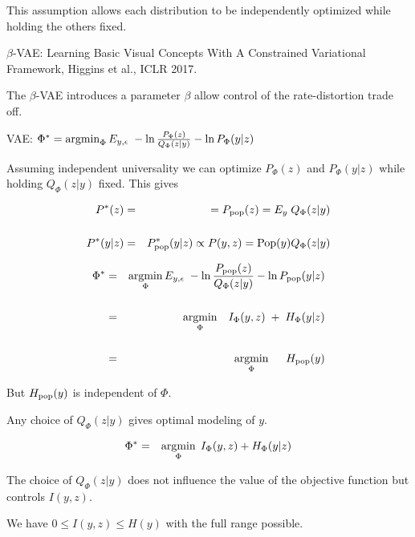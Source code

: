 {\vfill
This assumption allows each distribution to be independently optimized while holding the others fixed.


$\beta$-VAE: Learning Basic Visual Concepts With A
Constrained Variational Framework, Higgins et al., ICLR 2017.

\vfill
The $\beta$-VAE introduces a parameter $\beta$ allow control of the rate-distortion trade off.


VAE: $\Phi^* = \operatorname*{argmin}_\Phi E_{y,\epsilon}\;-\ln \frac{P_\Phi(z)}{Q_\Phi(z|y)} - \ln P_\Phi(y|z)$

\vfill
Assuming independent universality we can optimize $P_\Phi(z)$ and $P_\Phi(y|z)$ while holding $Q_\Phi(z|y)$ fixed.
This gives

\begin{eqnarray*}
P^*(z) & = & = P_{\mathrm{pop}}(z) = E_y \;Q_\Phi(z|y) \\
\\
P^*(y|z) & = & P^*_{\mathrm{pop}}(y|z) \propto P(y,z) = \mathrm{Pop}(y)Q_\Phi(z|y)
\end{eqnarray*}


\begin{eqnarray*}
\Phi^* & = & \operatorname*{argmin}_\Phi E_{y,\epsilon}\;-\ln \frac{P_{\mathrm{pop}}(z)}{Q_\Phi(z|y)} - \ln P_{\mathrm{pop}}(y|z) \\
\\
& = & \operatorname*{argmin}_\Phi \;\;\;I_\Phi(y,z)\; + \; H_\Phi(y|z) \\
\\
& = & \operatorname*{argmin}_\Phi \;\;\;\;\; H_{\mathrm{pop}}(y)
\end{eqnarray*}

\vfill
But $H_{\mathrm{pop}}(y)$ is independent of $\Phi$.

\vfill
Any choice of $Q_\Phi(z|y)$ gives optimal modeling of $y$.


\begin{eqnarray*}
\Phi^* & = & \operatorname*{argmin}_\Phi \; I_\Phi(y,z) + H_\Phi(y|z)
\end{eqnarray*}

\vfill
The choice of $Q_\Phi(z|y)$ does not influence the value of the objective function but controls $I(y,z)$.

\vfill
We have $0 \leq I(y,z) \leq H(y)$ with the full range possible.


}
